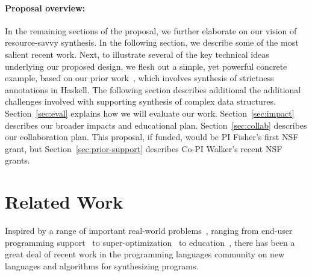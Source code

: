 \paragraph*{Proposal overview:}  In the remaining sections of the 
proposal, we further elaborate on our vision of
resource-savvy synthesis. 
In the following section, we describe some of the most salient recent work.
Next, to illustrate several of
the key technical ideas underlying our proposed design, we flesh out a
simple, yet powerful concrete example, based on our
prior work~\cite{autobahn}, which involves synthesis of strictness
annotations in Haskell.  The following section describes additional
the additional challenges involved with supporting synthesis of complex
data structures.  Section~\ref{sec:eval} explains how we will evaluate
our work.  Section~\ref{sec:impact} describes our broader impacts
and educational plan.  Section~\ref{sec:collab} describes our collaboration plan.
This proposal, if funded, would be PI Fisher's first NSF grant, but
Section~\ref{sec:prior-support} describes Co-PI Walker's recent NSF grants.

\section{Related Work}
\label{sec:related}


Inspired by a range of important real-world
problems~\cite{inductive-programming-meets-real-world}, ranging from
end-user programming
support~\cite{Barowy:flashrelate,Harris:spread-sheets} to
super-optimization~\cite{stochastic-superopt} to
education~\cite{Gulwani:cacm-education,Singh:education}, there has
been a great deal of recent work in the programming languages
community on new languages and algorithms for synthesizing programs.


